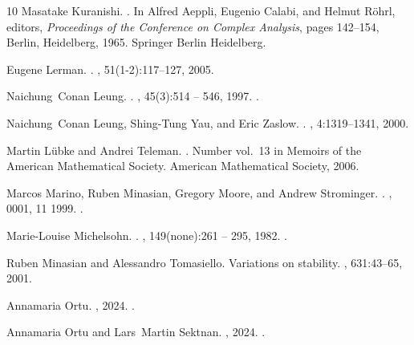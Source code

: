 \documentclass{article}
\theoremstyle{remark}
\theoremstyle{definition}
\begin{document}
\begin{thebibliography}{10}
Masatake Kuranishi.
.
\newblock In Alfred Aeppli, Eugenio Calabi, and Helmut R{\"o}hrl, editors, {\em {Proceedings of the Conference on Complex Analysis}}, pages 142--154, Berlin, Heidelberg, 1965. Springer Berlin Heidelberg.

Eugene Lerman.
.
, 51(1-2):117--127, 2005.

Naichung~Conan Leung.
.
, 45(3):514 -- 546, 1997.
\newblock \href {https://doi.org/10.4310/jdg/1214459841} {}.

Naichung~Conan Leung, Shing-Tung Yau, and Eric Zaslow.
.
, 4:1319--1341, 2000.

Martin L{\"u}bke and Andrei Teleman.
.
\newblock Number vol.~13 in Memoirs of the American Mathematical Society. American Mathematical Society, 2006.

Marcos Marino, Ruben Minasian, Gregory Moore, and Andrew Strominger.
.
, 0001, 11 1999.
\newblock \href {https://doi.org/10.1088/1126-6708/2000/01/005} {}.

Marie-Louise Michelsohn.
.
, 149(none):261 -- 295, 1982.
\newblock \href {https://doi.org/10.1007/BF02392356} {}.

Ruben Minasian and Alessandro Tomasiello.
\newblock Variations on stability.
, 631:43--65, 2001.

Annamaria Ortu.
, 2024.
\newblock \href {https://arxiv.org/abs/2407.03246} {}.

Annamaria Ortu and Lars~Martin Sektnan.
, 2024.
\newblock \href {https://arxiv.org/abs/2406.08284} {}.


\end{thebibliography}
\end{document}
